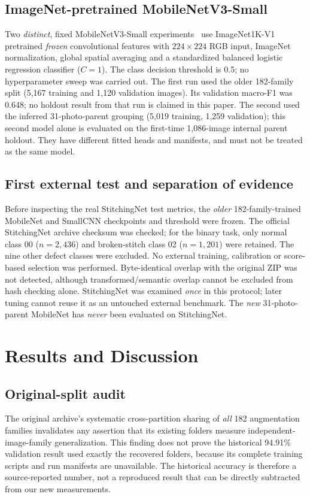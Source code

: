 \documentclass[conference,a4paper]{IEEEtran}
\begin{document}
\subsection{ImageNet-pretrained MobileNetV3-Small}
Two \emph{distinct}, fixed MobileNetV3-Small experiments~\cite{mobilenet} use ImageNet1K-V1 pretrained \emph{frozen} convolutional features with $224\times224$ RGB input, ImageNet normalization, global spatial averaging and a standardized balanced logistic regression classifier ($C=1$). The class decision threshold is 0.5; no hyperparameter sweep was carried out. The first run used the older 182-family split (5,167 training and 1,120 validation images). Its validation macro-F1 was 0.648; no holdout result from that run is claimed in this paper. The second used the inferred 31-photo-parent grouping (5,019 training, 1,259 validation); this second model alone is evaluated on the first-time 1,086-image internal parent holdout. They have different fitted heads and manifests, and must not be treated as the same model.

\subsection{First external test and separation of evidence}
Before inspecting the real StitchingNet test metrics, the \emph{older} 182-family-trained MobileNet and SmallCNN checkpoints and threshold were frozen. The official StitchingNet archive checksum was checked; for the binary task, only normal class 00 ($n=2{,}436$) and broken-stitch class 02 ($n=1{,}201$) were retained. The nine other defect classes were excluded. No external training, calibration or score-based selection was performed. Byte-identical overlap with the original ZIP was not detected, although transformed/semantic overlap cannot be excluded from hash checking alone. StitchingNet was examined \emph{once} in this protocol; later tuning cannot reuse it as an untouched external benchmark. The \emph{new} 31-photo-parent MobileNet has \emph{never} been evaluated on StitchingNet.

\section{Results and Discussion}
\subsection{Original-split audit}
The original archive's systematic cross-partition sharing of \emph{all} 182 augmentation families invalidates any assertion that its existing folders measure independent-image-family generalization. This finding does not prove the historical 94.91\% validation result used exactly the recovered folders, because its complete training scripts and run manifests are unavailable. The historical accuracy is therefore a source-reported number, not a reproduced result that can be directly subtracted from our new measurements.
\end{document}
